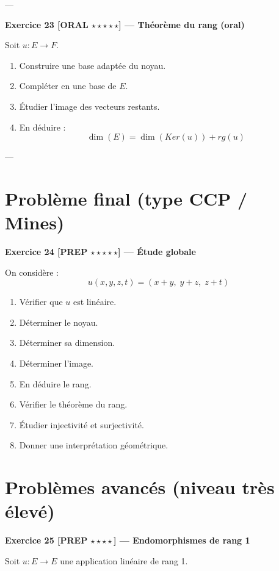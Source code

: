 \documentclass[11pt,a4paper]{article}
\begin{document}
---

\textbf{Exercice 23 [ORAL $\star\star\star\star\star$] — Théorème du rang (oral)}

Soit $u : E \to F$.

\begin{enumerate}
\item Construire une base adaptée du noyau.
\item Compléter en une base de $E$.
\item Étudier l’image des vecteurs restants.
\item En déduire :
\[
\dim(E) = \dim(Ker(u)) + rg(u)
\]
\end{enumerate}

---

\section{Problème final (type CCP / Mines)}

\textbf{Exercice 24 [PREP $\star\star\star\star\star$] — Étude globale}

On considère :
\[
u(x,y,z,t) = (x+y,\; y+z,\; z+t)
\]

\begin{enumerate}
\item Vérifier que $u$ est linéaire.
\item Déterminer le noyau.
\item Déterminer sa dimension.
\item Déterminer l’image.
\item En déduire le rang.
\item Vérifier le théorème du rang.
\item Étudier injectivité et surjectivité.
\item Donner une interprétation géométrique.
\end{enumerate}
\section{Problèmes avancés (niveau très élevé)}

\textbf{Exercice 25 [PREP $\star\star\star\star$] — Endomorphismes de rang 1}

Soit $u : E \to E$ une application linéaire de rang 1.
\end{document}

